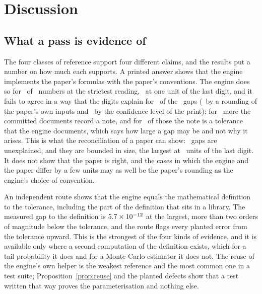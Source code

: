 \section{Discussion}
\label{sec:discussion}

\subsection{What a pass is evidence of}
\label{sec:discussion-evidence}

The four classes of reference support four different claims, and the results put a number on how much each supports. A printed answer shows that the engine implements the paper's formulas with the paper's conventions. The engine does so for \nPrintedAgree\ of \nPrintedN\ numbers at the strictest reading, \nAgreeOneUnit\ at one unit of the last digit, and it fails to agree in a way that the digits explain for \nMissTested\ of the \nMissTotal\ gaps (\nMissRound\ by a rounding of the paper's own inputs and \nMissLevel\ by the confidence level of the print); for \nMissRecorded\ more the committed documents record a note, and for \nMissTol\ of those the note is a tolerance that the engine documents, which says how large a gap may be and not why it arises. This is what the reconciliation of a paper can show: \nMissNone\ gaps are unexplained, and they are bounded in size, the largest at \nMissNoneMax\ units of the last digit. It does not show that the paper is right, and the cases in which the engine and the paper differ by a few units may as well be the paper's rounding as the engine's choice of convention.

An independent route shows that the engine equals the mathematical definition to the tolerance, including the part of the definition that sits in a library. The measured gap to the definition is $5.7\times10^{-12}$ at the largest, more than two orders of magnitude below the tolerance, and the route flags every planted error from the tolerance upward. This is the strongest of the four kinds of evidence, and it is available only where a second computation of the definition exists, which for a tail probability it does and for a Monte Carlo estimator it does not. The reuse of the engine's own helper is the weakest reference and the most common one in a test suite; Proposition~\ref{prop:reuse} and the planted defects show that a test written that way proves the parameterisation and nothing else.

